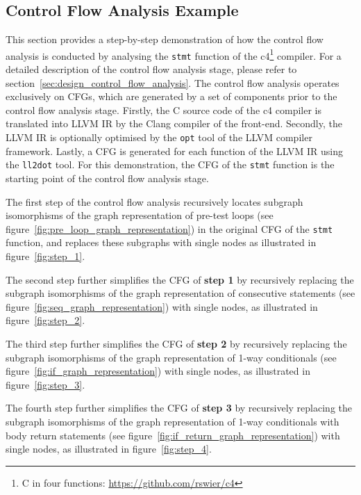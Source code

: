 
\subsection{Control Flow Analysis Example}
\label{app:control_flow_analysis_example}

This section provides a step-by-step demonstration of how the control flow analysis is conducted by analysing the \texttt{stmt} function of the c4\footnote{C in four functions: \url{https://github.com/rswier/c4}} compiler. For a detailed description of the control flow analysis stage, please refer to section~\ref{sec:design_control_flow_analysis}. The control flow analysis operates exclusively on CFGs, which are generated by a set of components prior to the control flow analysis stage. Firstly, the C source code of the c4 compiler is translated into LLVM IR by the Clang compiler of the front-end. Secondly, the LLVM IR is optionally optimised by the \texttt{opt} tool of the LLVM compiler framework. Lastly, a CFG is generated for each function of the LLVM IR using the \texttt{ll2dot} tool. For this demonstration, the CFG of the \texttt{stmt} function is the starting point of the control flow analysis stage.

The first step of the control flow analysis recursively locates subgraph isomorphisms of the graph representation of pre-test loops (see figure~\ref{fig:pre_loop_graph_representation}) in the original CFG of the \texttt{stmt} function, and replaces these subgraphs with single nodes as illustrated in figure~\ref{fig:step_1}.

The second step further simplifies the CFG of \textbf{step 1} by recursively replacing the subgraph isomorphisms of the graph representation of consecutive statements (see figure~\ref{fig:seq_graph_representation}) with single nodes, as illustrated in figure~\ref{fig:step_2}.

The third step further simplifies the CFG of \textbf{step 2} by recursively replacing the subgraph isomorphisms of the graph representation of 1-way conditionals (see figure~\ref{fig:if_graph_representation}) with single nodes, as illustrated in figure~\ref{fig:step_3}.

The fourth step further simplifies the CFG of \textbf{step 3} by recursively replacing the subgraph isomorphisms of the graph representation of 1-way conditionals with body return statements (see figure~\ref{fig:if_return_graph_representation}) with single nodes, as illustrated in figure~\ref{fig:step_4}.

